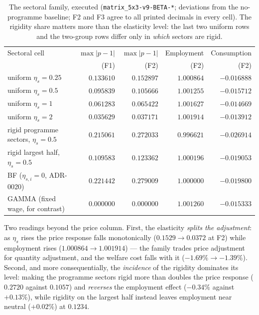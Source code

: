 \documentclass[11pt]{article}
\begin{document}
\begin{table}[htbp]
\centering
\caption{The sectoral family, executed (\texttt{matrix\_5x3-v9-BETA-*};
deviations from the no-programme baseline; F2 and F3 agree to all printed
decimals in every cell). The rigidity share matters more than the elasticity
level: the last two uniform rows and the two-group rows differ only in
\emph{which} sectors are rigid.}
\label{tab:ladder}
\begin{tabular}{lrrrr}
\toprule
Sectoral cell & $\max|p-1|$ & $\max|p-1|$ & Employment & Consumption \\
 & (F1) & (F2) & (F2) & (F2) \\
\midrule
uniform $\eta_s = 0.25$ & $0.133610$ & $0.152897$ & $1.000864$ & $-0.016888$ \\
uniform $\eta_s = 0.5$  & $0.095839$ & $0.105666$ & $1.001255$ & $-0.015712$ \\
uniform $\eta_s = 1$    & $0.061283$ & $0.065422$ & $1.001627$ & $-0.014669$ \\
uniform $\eta_s = 2$    & $0.035629$ & $0.037171$ & $1.001914$ & $-0.013912$ \\
\midrule
rigid programme sectors, $\eta_s = 0.5$ & $0.215061$ & $0.272033$ & $0.996621$ & $-0.026914$ \\
rigid largest half, $\eta_s = 0.5$ & $0.109583$ & $0.123362$ & $1.000196$ & $-0.019053$ \\
\midrule
BF ($\eta_{s,i} = 0$, ADR-0020) & $0.221442$ & $0.279009$ & $1.000000$ & $-0.019800$ \\
GAMMA (fixed wage, for contrast) & $0.000000$ & $0.000000$ & $1.001260$ & $-0.015333$ \\
\bottomrule
\end{tabular}
\end{table}

Two readings beyond the price column. First, the elasticity \emph{splits the
adjustment}: as $\eta_s$ rises the price response falls monotonically
($0.1529 \to 0.0372$ at F2) while employment rises ($1.000864 \to 1.001914$) ---
the family trades price adjustment for quantity adjustment, and the welfare
cost falls with it ($-1.69\% \to -1.39\%$). Second, and more consequentially,
the \emph{incidence} of the rigidity dominates its level: making the programme
sectors rigid more than doubles the price response ($0.2720$ against $0.1057$)
and \emph{reverses} the employment effect ($-0.34\%$ against $+0.13\%$), while
rigidity on the largest half instead leaves employment near neutral
($+0.02\%$) at $0.1234$.
\end{document}
